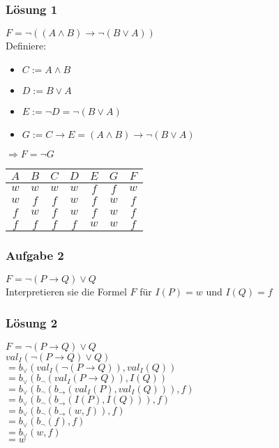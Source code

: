 \documentclass{beamer}
\begin{document}
	\begin{frame}
		\frametitle{Lösung 1}
		$F = \neg((A\wedge B)\rightarrow\neg(B\vee A))$\\
		Definiere:\\
		\begin{itemize}
			\item $C:=A\wedge B$
			\item $D:=B\vee A$
			\item $E:=\neg D=\neg(B\vee A)$
			\item $G:=C\rightarrow E=(A\wedge B)\rightarrow\neg(B\vee A)$
		\end{itemize}
		$\Rightarrow F=\neg G$\\
		\begin{tabular}{cc|cccc|c}
			$A$ & $B$ & $C$ & $D$ & $E$ & $G$ & $F$\\
			\hline
			$w$ & $w$ & $w$ & $w$ & $f$ & $f$ & $w$\\
			$w$ & $f$ & $f$ & $w$ & $f$ & $w$ & $f$\\
			$f$ & $w$ & $f$ & $w$ & $f$ & $w$ & $f$\\
			$f$ & $f$ & $f$ & $f$ & $w$ & $w$ & $f$\\
		\end{tabular}
	\end{frame}
	\begin{frame}
		\frametitle{Aufgabe 2}
		$F=\neg(P\rightarrow Q)\vee Q$\\
		Interpretieren sie die Formel $F$ für $I(P)=w$ und $I(Q)=f$\\
	\end{frame}
	\begin{frame}
		\frametitle{Lösung 2}
		$F=\neg(P\rightarrow Q)\vee Q$\\
		$val_{I}(\neg(P\rightarrow Q)\vee Q)$\\
		\pause
		$=b_{\vee}(val_{I}(\neg(P\rightarrow Q)), val_{I}(Q))$\\
		\pause
		$=b_{\vee}(b_{\neg}(val_{I}(P\rightarrow Q)), I(Q))$\\
		\pause
		$=b_{\vee}(b_{\neg}(b_{\rightarrow}(val_{I}(P), val_{I}(Q))), f)$\\
		\pause
		$=b_{\vee}(b_{\neg}(b_{\rightarrow}(I(P), I(Q))), f)$\\
		\pause
		$=b_{\vee}(b_{\neg}(b_{\rightarrow}(w, f)), f)$\\
		\pause
		$=b_{\vee}(b_{\neg}(f), f)$\\
		\pause
		$=b_{\vee}(w, f)$\\
		\pause
		$=w$\\
	\end{frame}
\end{document}
